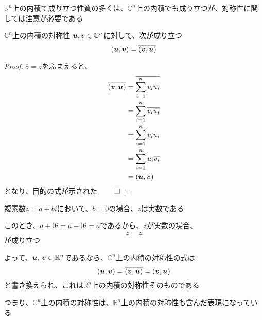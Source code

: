\documentclass[../../../topic_linear-algebra]{subfiles}
\begin{document}
\sectionline

$\mathbb{R}^n$上の内積で成り立つ性質の多くは、$\mathbb{C}^n$上の内積でも成り立つが、対称性に関しては注意が必要である

\begin{theorem}{$\mathbb{C}^n$上の内積の対称性}
  $\vb*{u}, \vb*{v} \in \mathbb{C}^n$に対して、次が成り立つ
  \begin{equation*}
    (\vb*{u}, \vb*{v}) = \overline{(\vb*{v}, \vb*{u})}
  \end{equation*}
\end{theorem}

\begin{proof}
  $\overline{\overline{z}} = z$をふまえると、
  \begin{align*}
    \overline{(\vb*{v}, \vb*{u})} & = \overline{\sum_{i=1}^n v_i \overline{u_i}} \\
                                  & = \sum_{i=1}^n \overline{v_i \overline{u_i}} \\
                                  & = \sum_{i=1}^n \overline{v_i} u_i            \\
                                  & = \sum_{i=1}^n u_i \overline{v_i}            \\
                                  & = (\vb*{u}, \vb*{v})
  \end{align*}
  となり、目的の式が示された $\qed$
\end{proof}

複素数$z=a+bi$において、$b=0$の場合、$z$は実数である

このとき、$a+0i = a-0i = a$であるから、$z$が実数の場合、
\begin{equation*}
  \overline{z} = z
\end{equation*}
が成り立つ

\br

よって、$\vb*{u},\,\vb*{v} \in \mathbb{R}^n$であるなら、$\mathbb{C}^n$上の内積の対称性の式は
\begin{equation*}
  (\vb*{u}, \vb*{v}) = \overline{(\vb*{v}, \vb*{u})} = (\vb*{v}, \vb*{u})
\end{equation*}
と書き換えられ、これは$\mathbb{R}^n$上の内積の対称性そのものである

\br

つまり、$\mathbb{C}^n$上の内積の対称性は、$\mathbb{R}^n$上の内積の対称性も含んだ表現になっている
\end{document}
